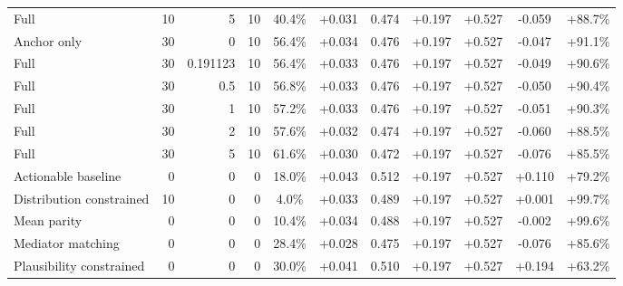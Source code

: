 \begin{table}[htbp]
\begin{tabular}{lrrrccccccc}
Full & 10 & 5 & 10 & 40.4\% & +0.031 & 0.474 & +0.197 & +0.527 & -0.059 & +88.7\% \\
Anchor only & 30 & 0 & 10 & 56.4\% & +0.034 & 0.476 & +0.197 & +0.527 & -0.047 & +91.1\% \\
Full & 30 & 0.191123 & 10 & 56.4\% & +0.033 & 0.476 & +0.197 & +0.527 & -0.049 & +90.6\% \\
Full & 30 & 0.5 & 10 & 56.8\% & +0.033 & 0.476 & +0.197 & +0.527 & -0.050 & +90.4\% \\
Full & 30 & 1 & 10 & 57.2\% & +0.033 & 0.476 & +0.197 & +0.527 & -0.051 & +90.3\% \\
Full & 30 & 2 & 10 & 57.6\% & +0.032 & 0.474 & +0.197 & +0.527 & -0.060 & +88.5\% \\
Full & 30 & 5 & 10 & 61.6\% & +0.030 & 0.472 & +0.197 & +0.527 & -0.076 & +85.5\% \\
Actionable baseline & 0 & 0 & 0 & 18.0\% & +0.043 & 0.512 & +0.197 & +0.527 & +0.110 & +79.2\% \\
Distribution constrained & 10 & 0 & 0 & 4.0\% & +0.033 & 0.489 & +0.197 & +0.527 & +0.001 & +99.7\% \\
Mean parity & 0 & 0 & 0 & 10.4\% & +0.034 & 0.488 & +0.197 & +0.527 & -0.002 & +99.6\% \\
Mediator matching & 0 & 0 & 0 & 28.4\% & +0.028 & 0.475 & +0.197 & +0.527 & -0.076 & +85.6\% \\
Plausibility constrained & 0 & 0 & 0 & 30.0\% & +0.041 & 0.510 & +0.197 & +0.527 & +0.194 & +63.2\% \\
\bottomrule
\end{tabular}
\end{table}